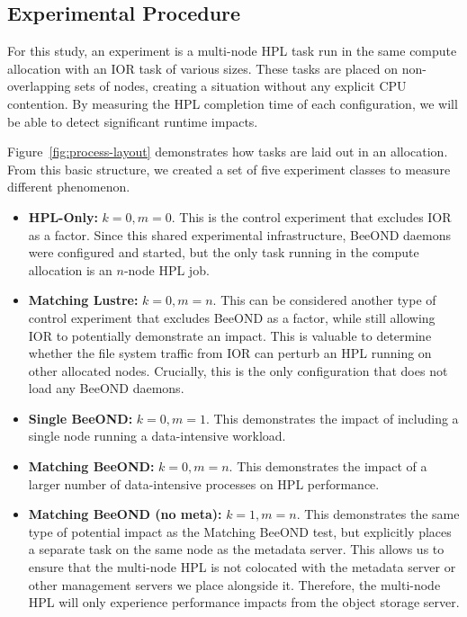 \subsection{Experimental Procedure}

For this study, an experiment is a multi-node HPL task run in the same compute allocation with an IOR task of various sizes. These tasks are placed on non-overlapping sets of nodes, creating a situation without any explicit CPU contention. By measuring the HPL completion time of each configuration, we will be able to detect significant runtime impacts.

Figure~\ref{fig:process-layout} demonstrates how tasks are laid out in an allocation. From this basic structure, we created a set of five experiment classes to measure different phenomenon.
\begin{itemize}
\item {\bf HPL-Only:} $k=0,m=0$. This is the control experiment that excludes IOR as a factor. Since this shared experimental infrastructure, BeeOND daemons were configured and started, but the only task running in the compute allocation is an $n$-node HPL job.
\item {\bf Matching Lustre:} $k=0,m=n$. This can be considered another type of control experiment that excludes BeeOND as a factor, while still allowing IOR to potentially demonstrate an impact. This is valuable to determine whether the file system traffic from IOR can perturb an HPL running on other allocated nodes. Crucially, this is the only configuration that does not load any BeeOND daemons.
\item {\bf Single BeeOND:} $k=0,m=1$. This demonstrates the impact of including a single node running a data-intensive workload. 
\item {\bf Matching BeeOND:} $k=0,m=n$. This demonstrates the impact of a larger number of data-intensive processes on HPL performance.
\item {\bf Matching BeeOND (no meta):} $k=1,m=n$. This demonstrates the same type of potential impact as the Matching BeeOND test, but explicitly places a separate task on the same node as the metadata server. This allows us to ensure that the multi-node HPL is not colocated with the metadata server or other management servers we place alongside it. Therefore, the multi-node HPL will only experience performance impacts from the object storage server.
\end{itemize}

